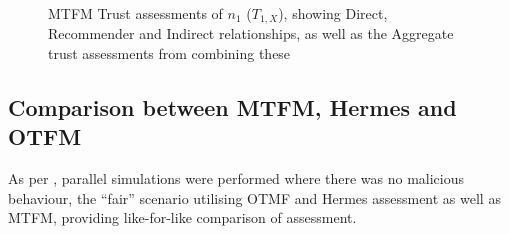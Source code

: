 \documentclass[conference]{IEEEtran}
\begin{document}
\begin{figure}[h]
  \caption{MTFM Trust assessments of $n_1$ ($T_{1,X}$), showing Direct, Recommender and Indirect relationships, as well as the Aggregate trust assessments from combining these\protect\footnotemark} 
  \label{fig:trust_mobility}
\end{figure}
%

\subsection{Comparison between MTFM, Hermes and OTFM}
As per \cite{Guo11}, parallel simulations were performed where there was no malicious behaviour, the ``fair'' scenario utilising OTMF and Hermes assessment as well as MTFM, providing like-for-like comparison of assessment.
\end{document}
